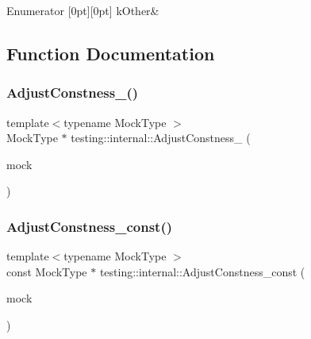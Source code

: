 \begin{DoxyEnumFields}{Enumerator}
[0pt][0pt]{}\mbox{\label{namespacetesting_1_1internal_aa8747bda20137c9aa7f846dee830e686a89b3fd4ec20d3052f5ee8b574e13d581}} 
k\+Other&\\
\hline

\end{DoxyEnumFields}


\subsection{Function Documentation}
\mbox{\label{namespacetesting_1_1internal_a5b32070bcc46f4021c80186e07bc3008}} 
\subsubsection{\texorpdfstring{AdjustConstness\_()}{AdjustConstness\_()}}
{\footnotesize\ttfamily template$<$typename Mock\+Type $>$ \\
Mock\+Type $\ast$ testing\+::internal\+::\+Adjust\+Constness\+\_\+ (\begin{DoxyParamCaption}\item[{const Mock\+Type $\ast$}]{mock }\end{DoxyParamCaption})}

\mbox{\label{namespacetesting_1_1internal_a758f640e990a927dc148d6b960c0704b}} 
\subsubsection{\texorpdfstring{AdjustConstness\_const()}{AdjustConstness\_const()}}
{\footnotesize\ttfamily template$<$typename Mock\+Type $>$ \\
const Mock\+Type $\ast$ testing\+::internal\+::\+Adjust\+Constness\+\_\+const (\begin{DoxyParamCaption}\item[{const Mock\+Type $\ast$}]{mock }\end{DoxyParamCaption})}

